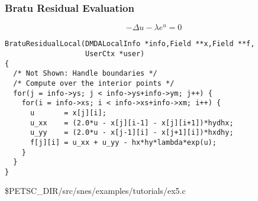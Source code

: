 \begin{frame}[fragile]
\frametitle{Bratu Residual Evaluation}

\begin{equation*}
  -\Delta u - \lambda e^{u} = 0
\end{equation*}

\small
\begin{verbatim}
BratuResidualLocal(DMDALocalInfo *info,Field **x,Field **f,
                   UserCtx *user)
{
  /* Not Shown: Handle boundaries */
  /* Compute over the interior points */
  for(j = info->ys; j < info->ys+info->ym; j++) {
    for(i = info->xs; i < info->xs+info->xm; i++) {
      u       = x[j][i];
      u_xx    = (2.0*u - x[j][i-1] - x[j][i+1])*hydhx;
      u_yy    = (2.0*u - x[j-1][i] - x[j+1][i])*hxdhy;
      f[j][i] = u_xx + u_yy - hx*hy*lambda*exp(u);
    }
  }
}
\end{verbatim}

\begin{center}\small
\$PETSC\_DIR/src/snes/examples/tutorials/ex5.c
\end{center}
\end{frame}
